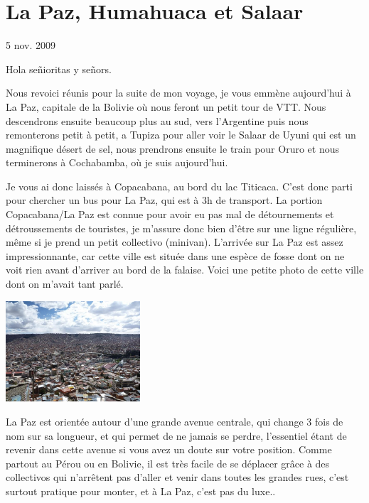 \section{La Paz, Humahuaca et Salaar}

5 nov. 2009

\begin{multicols}{2}

Hola señioritas y señors.

Nous revoici réunis pour la suite de mon voyage, je vous emmène aujourd'hui à La Paz, capitale de la Bolivie où nous feront un petit tour de VTT. Nous descendrons ensuite beaucoup plus au sud, vers l'Argentine puis nous remonterons petit à petit, a Tupiza pour aller voir le Salaar de Uyuni qui est un magnifique désert de sel, nous prendrons ensuite le train pour Oruro et nous terminerons à Cochabamba, où je suis aujourd'hui.

Je vous ai donc laissés à Copacabana, au bord du lac Titicaca. C'est donc parti pour chercher un bus pour La Paz, qui est à 3h de transport. La portion Copacabana/La Paz est connue pour avoir eu pas mal de détournements et détroussements de touristes, je m'assure donc bien d'être sur une ligne régulière, même si je prend un petit collectivo (minivan). L'arrivée sur La Paz est assez impressionnante, car cette ville est située dans une espèce de fosse dont on ne voit rien avant d'arriver au bord de la falaise. Voici une petite photo de cette ville dont on m'avait tant parlé.

\smallbreak
\hspace*{-0.65cm}
\includegraphics[width=5cm]{articles/La-paz-humahuaca-et-salaar/1257387232lefu.jpg}
\smallbreak

La Paz est orientée autour d'une grande avenue centrale, qui change 3 fois de nom sur sa longueur, et qui permet de ne jamais se perdre, l'essentiel étant de revenir dans cette avenue si vous avez un doute sur votre position. Comme partout au Pérou ou en Bolivie, il est très facile de se déplacer grâce à des collectivos qui n'arrêtent pas d'aller et venir dans toutes les grandes rues, c'est surtout pratique pour monter, et à La Paz, c'est pas du luxe..


\end{multicols}
